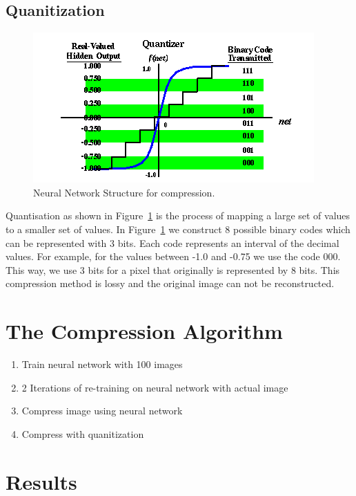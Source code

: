 \documentclass[10pt,conference,compsocconf]{IEEEtran}
\begin{document}
\subsection{Quanitization}
\begin{figure}[tbp]
  \centering
  \includegraphics[width=\columnwidth]{bpQuantizer}
  \caption{Neural Network Structure for compression.}
  \label{fig:bpQuantizer}
\end{figure}

Quantisation as shown in Figure~\ref{fig:bpQuantizer} is the process of mapping a large set of values to a smaller set of values. In Figure~\ref{fig:bpQuantizer} we construct 8 possible binary codes which can be represented with 3 bits. Each code represents an interval of the decimal values. For example, for the values between -1.0 and -0.75 we use the code 000. This way, we use 3 bits for a pixel that originally is represented by 8 bits. This compression method is lossy and the original image can not be reconstructed. 

\section{The Compression Algorithm}
\label{sec:compAlg}

\begin{enumerate}
\item Train neural network with 100 images
\item 2 Iterations of re-training on neural network with actual image
\item Compress image using neural network
\item Compress with quanitization

\end{enumerate}

\section{Results}
\end{document}
